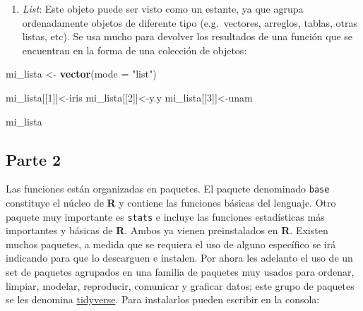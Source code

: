 \documentclass[]{article}
\newenvironment{Shaded}{\begin{snugshade}}{\end{snugshade}}
\newcommand{\DataTypeTok}[1]{\textcolor[rgb]{0.13,0.29,0.53}{#1}}
\newcommand{\DecValTok}[1]{\textcolor[rgb]{0.00,0.00,0.81}{#1}}
\newcommand{\KeywordTok}[1]{\textcolor[rgb]{0.13,0.29,0.53}{\textbf{#1}}}
\newcommand{\NormalTok}[1]{#1}
\newcommand{\StringTok}[1]{\textcolor[rgb]{0.31,0.60,0.02}{#1}}
\providecommand{\tightlist}{%
  \setlength{\itemsep}{0pt}\setlength{\parskip}{0pt}}
\begin{document}
\begin{enumerate}
\def\labelenumi{\Alph{enumi})}
\setcounter{enumi}{4}
\tightlist
\item
  \emph{List}: Este objeto puede ser visto como un estante, ya que
  agrupa ordenadamente objetos de diferente tipo (e.g.~vectores,
  arreglos, tablas, otras listas, etc). Se usa mucho para devolver los
  resultados de una función que se encuentran en la forma de una
  colección de objetos:
\end{enumerate}

\begin{Shaded}
\begin{Highlighting}[]
\NormalTok{mi_lista <-}\StringTok{ }\KeywordTok{vector}\NormalTok{(}\DataTypeTok{mode =} \StringTok{"list"}\NormalTok{)}

\NormalTok{mi_lista[[}\DecValTok{1}\NormalTok{]]<-iris}
\NormalTok{mi_lista[[}\DecValTok{2}\NormalTok{]]<-y.y}
\NormalTok{mi_lista[[}\DecValTok{3}\NormalTok{]]<-unam}

\NormalTok{mi_lista}
\end{Highlighting}
\end{Shaded}

\hypertarget{parte-2}{%
\subsection{Parte 2}\label{parte-2}}

Las funciones están organizadas en paquetes. El paquete denominado
\texttt{base} constituye el núcleo de \textbf{R} y contiene las
funciones básicas del lenguaje. Otro paquete muy importante es
\texttt{stats} e incluye las funciones estadísticas más importantes y
básicas de \textbf{R}. Ambos ya vienen preinstalados en \textbf{R}.
Existen muchos paquetes, a medida que se requiera el uso de alguno
específico se irá indicando para que lo descarguen e instalen. Por ahora
les adelanto el uso de un set de paquetes agrupados en una familia de
paquetes muy usados para ordenar, limpiar, modelar, reproducir,
comunicar y graficar datos; este grupo de paquetes se les denomina
\href{https://www.tidyverse.org/}{tidyverse}. Para instalarlos pueden
escribir en la consola:
\end{document}
